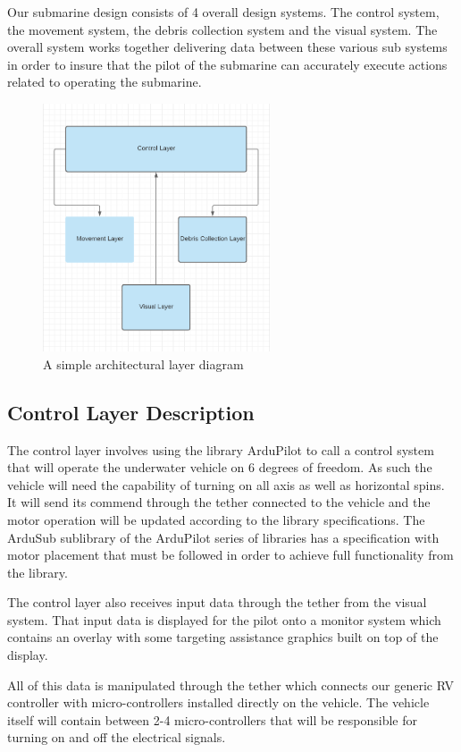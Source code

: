 Our submarine design consists of 4 overall design systems. The control system, the movement system, the debris collection system and the visual system. The overall system works together delivering data between these various sub systems in order to insure that the pilot of the submarine can accurately execute actions related to operating the submarine.

\begin{figure}[h!]
	\centering
 	\includegraphics[width=0.60\textwidth]{images/layers}
 \caption{A simple architectural layer diagram}
\end{figure}

\subsection{Control Layer Description}
The control layer involves using the library ArduPilot to call a control system that will operate the underwater vehicle on 6 degrees of freedom. As such the vehicle will need the capability of turning on all axis as well as horizontal spins. It will send its commend through the tether connected to the vehicle and the motor operation will be updated according to the library specifications. The ArduSub sublibrary of the ArduPilot series of libraries has a specification with motor placement that must be followed in order to achieve full functionality from the library.

The control layer also receives input data through the tether from the visual system. That input data is displayed for the pilot onto a monitor system which contains an overlay with some targeting assistance graphics built on top of the display.

All of this data is manipulated through the tether which connects our generic RV controller with micro-controllers installed directly on the vehicle. The vehicle itself will contain between 2-4 micro-controllers that will be responsible for turning on and off the electrical signals.

